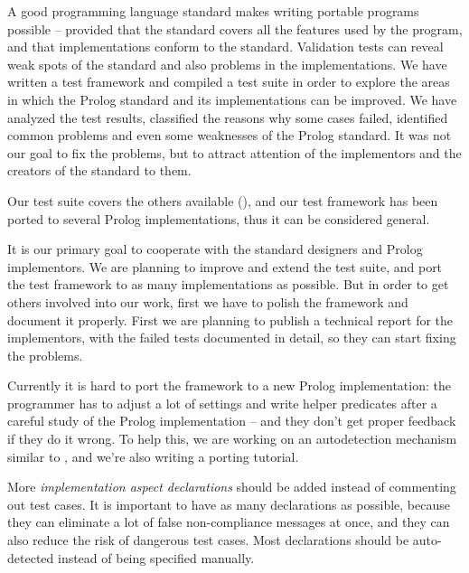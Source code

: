 \documentclass[draft]{llncs}%
\begin{document}
A good programming language standard makes writing portable programs
possible -- provided that the standard covers all the features used by the
program, and that implementations conform to the standard.
Validation tests can reveal weak spots of the standard and also problems
in the implementations.
We have written a test framework and compiled a test suite in order to
explore the areas in which the Prolog standard and its implementations can
be improved.
We have analyzed the test results, classified the reasons why some cases
failed, identified common problems and even some
weaknesses of the Prolog standard. It was not our goal to fix the problems,
but to attract attention of the implementors and the creators of the standard
to them.

Our test suite covers the others available
(\cite{isoprolog95,executable,validation}),
and our test framework has been ported to several Prolog implementations,
thus it can be considered general.


It is our primary goal to cooperate with the standard designers and Prolog
implementors. We are planning to improve and extend the test suite, and port
the test framework to as many implementations as possible. But in order to
get others involved into our work, first we have to polish the framework and
document it properly. First we are planning to publish a technical report for
the implementors, with the failed tests documented in detail, so they can
start fixing the problems.

Currently it is hard to port the framework to a new Prolog implementation:
the programmer has to adjust a lot of settings and write helper predicates
after a careful study of the Prolog implementation -- and they don't get
proper feedback if they do it wrong. To help this, we are working on an
autodetection mechanism similar to , and we're also
writing a porting tutorial.

More \emph{implementation aspect declarations} should be added instead of
commenting out test cases. It is important to have as many declarations as
possible, because they can eliminate a lot of false non-compliance messages at
once, and they can also reduce the risk of dangerous test cases.
Most declarations should be auto-detected instead of being specified manually.
\end{document}
